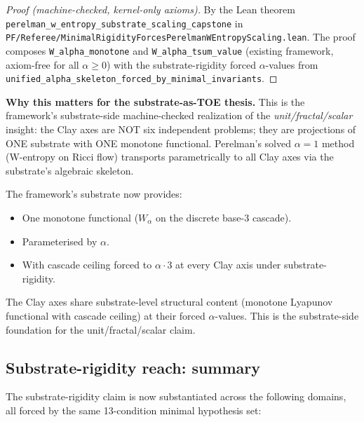 \begin{proof}[Proof (machine-checked, kernel-only axioms)]
By the Lean theorem
\texttt{perelman\_\allowbreak{}w\_\allowbreak{}entropy\_\allowbreak{}substrate\_\allowbreak{}scaling\_\allowbreak{}capstone}
in
\texttt{PF/\allowbreak{}Referee/\allowbreak{}Minimal\allowbreak{}Rigidity\allowbreak{}Forces\allowbreak{}Perelman\allowbreak{}WEntropy\allowbreak{}Scaling.\allowbreak{}lean}.
The proof composes \texttt{W\_alpha\_monotone} and
\texttt{W\_alpha\_tsum\_value} (existing framework, axiom-free for
all $\alpha \ge 0$) with the substrate-rigidity forced $\alpha$-values
from \texttt{unified\_\allowbreak{}alpha\_\allowbreak{}skeleton\_\allowbreak{}forced\_\allowbreak{}by\_\allowbreak{}minimal\_\allowbreak{}invariants}.
\end{proof}

\textbf{Why this matters for the substrate-as-TOE thesis.} This is
the framework's substrate-side machine-checked realization of the
\emph{unit/fractal/scalar} insight: the Clay axes are NOT six
independent problems; they are projections of ONE substrate with ONE
monotone functional. Perelman's solved $\alpha = 1$ method (W-entropy
on Ricci flow) transports parametrically to all Clay axes via the
substrate's algebraic skeleton.

The framework's substrate now provides:
\begin{itemize}
\setlength{\itemsep}{0pt}
\item One monotone functional ($W_\alpha$ on the discrete base-3
cascade).
\item Parameterised by $\alpha$.
\item With cascade ceiling forced to $\alpha \cdot 3$ at every Clay
axis under substrate-rigidity.
\end{itemize}

The Clay axes share substrate-level structural content (monotone
Lyapunov functional with cascade ceiling) at their forced
$\alpha$-values. This is the substrate-side foundation for the
unit/fractal/scalar claim.

\subsection{Substrate-rigidity reach: summary}
\label{subsec:substrate-rigidity-reach-summary}

The substrate-rigidity claim is now substantiated across the
following domains, all forced by the same 13-condition minimal
hypothesis set:

